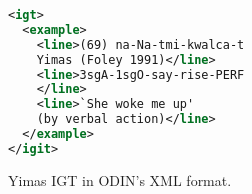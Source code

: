 


\begin{figure}[t]
\small
\begin{lstlisting}[language=XML]
<igt>
  <example>
    <line>(69) na-Na-tmi-kwalca-t 
    Yimas (Foley 1991)</line>
    <line>3sgA-1sgO-say-rise-PERF
    </line>
    <line>`She woke me up' 
    (by verbal action)</line>
  </example>
</igit>
\end{lstlisting} 
\smallskip
\caption{Yimas IGT in ODIN's XML format.}\label{fig:odin_yimas_xml}
\end{figure}






